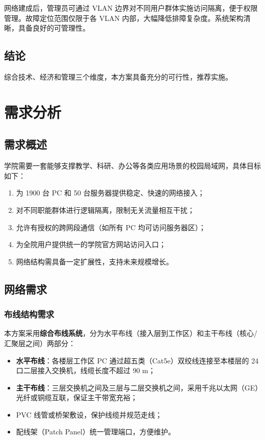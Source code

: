 \documentclass[12pt,a4paper]{ctexart}
\begin{document}
网络建成后，管理员可通过 VLAN 边界对不同用户群体实施访问隔离，便于权限管理。故障定位范围仅限于各 VLAN 内部，大幅降低排障复杂度。系统架构清晰，具备良好的可管理性。

\subsection{结论}

综合技术、经济和管理三个维度，本方案具备充分的可行性，推荐实施。

\section{需求分析}

\subsection{需求概述}

学院需要一套能够支撑教学、科研、办公等各类应用场景的校园局域网，具体目标如下：

\begin{enumerate}
  \item 为 1900 台 PC 和 50 台服务器提供稳定、快速的网络接入；
  \item 对不同职能群体进行逻辑隔离，限制无关流量相互干扰；
  \item 允许有授权的跨网段通信（如所有 PC 均可访问服务器区）；
  \item 为全院用户提供统一的学院官方网站访问入口；
  \item 网络结构需具备一定扩展性，支持未来规模增长。
\end{enumerate}

\subsection{网络需求}

\subsubsection{布线结构需求}

本方案采用\textbf{综合布线系统}，分为水平布线（接入层到工作区）和主干布线（核心/汇聚层之间）两部分：

\begin{itemize}
  \item \textbf{水平布线}：各楼层工作区 PC 通过超五类（Cat5e）双绞线连接至本楼层的 24 口二层接入交换机，线缆长度不超过 90 m；
  \item \textbf{主干布线}：三层交换机之间及三层与二层交换机之间，采用千兆以太网（GE）光纤或铜缆互联，保证主干带宽充裕；
  \item PVC 线管或桥架敷设，保护线缆并规范走线；
  \item 配线架（Patch Panel）统一管理端口，方便维护。
\end{itemize}
\end{document}
